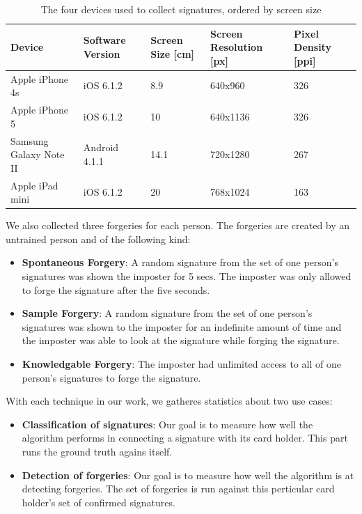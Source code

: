 \documentclass[a4paper, oneside]{csthesis}
\begin{document}
\begin{table}[tb]
    \begin{center}
        \begin{tabular}{p{1.75cm}|p{2cm}p{2cm}p{2cm}p{2cm}}
        \hline

        \hline
        \textbf{Device} & \textbf{Software Version} & \textbf{Screen Size [cm]} & \textbf{Screen Resolution [px]} & \textbf{Pixel Density [ppi]} \\
        \hline
        Apple iPhone 4s & iOS 6.1.2 & 8.9 & 640x960 & 326 \\
        \hdashline[0.5pt/3pt]
        Apple iPhone 5 & iOS 6.1.2 & 10 & 640x1136 & 326 \\
        \hdashline[0.5pt/3pt]
        Samsung Galaxy Note II & Android 4.1.1 & 14.1 & 720x1280 & 267 \\
        \hdashline[0.5pt/3pt]
        Apple iPad mini & iOS 6.1.2 & 20 & 768x1024 & 163\\
        \hline
        \end{tabular}
    \end{center}
    \label{tbl:signatures-devices}
    \caption{The four devices used to collect signatures, ordered by screen size}
\end{table}

We also collected three forgeries for each person. The forgeries are created by an untrained person and of the following kind:

\begin{itemize}
\item \textbf{Spontaneous Forgery}: A random signature from the set of one person's signatures was shown the imposter for 5 secs. The imposter was only allowed to forge the signature after the five seconds.
\item \textbf{Sample Forgery}: A random signature from the set of one person's signatures was shown to the imposter for an indefinite amount of time and the imposter was able to look at the signature while forging the signature.
\item \textbf{Knowledgable Forgery}: The imposter had unlimited access to all of one person's signatures to forge the signature.
\end{itemize}

With each technique in our work, we gatheres statistics about two use cases:
\begin{itemize}
\item \textbf{Classification of signatures}: Our goal is to measure how well the algorithm performs in connecting a signature with its card holder. This part runs the ground truth agains itself.
\item \textbf{Detection of forgeries}: Our goal is to measure how well the algorithm is at detecting forgeries. The set of forgeries is run against this perticular card holder's set of confirmed signatures.
\end{itemize}
\end{document}
